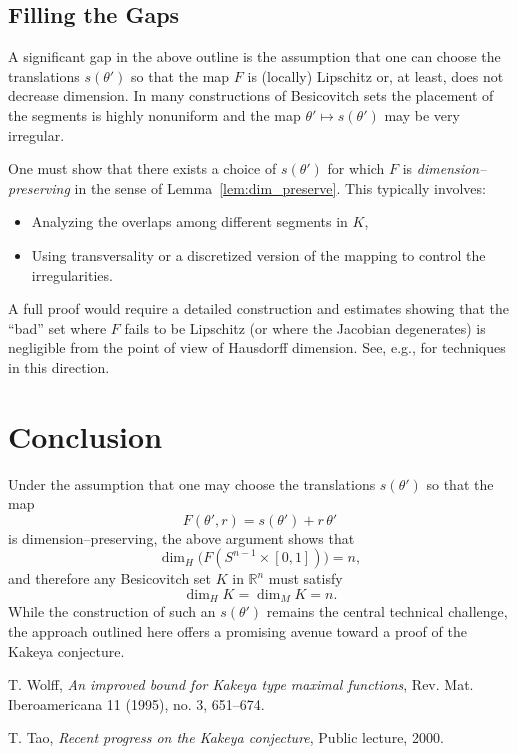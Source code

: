 \documentclass{amsart}
\begin{document}
\subsection{Filling the Gaps}
A significant gap in the above outline is the assumption that one can choose the translations $s(\theta')$ so that the map $F$ is (locally) Lipschitz or, at least, does not decrease dimension. In many constructions of Besicovitch sets the placement of the segments is highly nonuniform and the map $\theta'\mapsto s(\theta')$ may be very irregular.

One must show that there exists a choice of $s(\theta')$ for which $F$ is \emph{dimension–preserving} in the sense of Lemma~\ref{lem:dim_preserve}. This typically involves:
\begin{itemize}
    \item Analyzing the overlaps among different segments in $K$,
    \item Using transversality or a discretized version of the mapping to control the irregularities.
\end{itemize}
A full proof would require a detailed construction and estimates showing that the ``bad'' set where $F$ fails to be Lipschitz (or where the Jacobian degenerates) is negligible from the point of view of Hausdorff dimension. See, e.g., \cite{Wolff1995,Tao2000} for techniques in this direction.

\section{Conclusion}
Under the assumption that one may choose the translations $s(\theta')$ so that the map 
\[
F(\theta',r)= s(\theta')+r\,\theta'
\]
is dimension–preserving, the above argument shows that 
\[
\dim_H\bigl(F(S^{n-1}\times[0,1])\bigr)=n,
\]
and therefore any Besicovitch set $K$ in $\mathbb{R}^n$ must satisfy
\[
\dim_H K = \dim_M K = n.
\]
While the construction of such an $s(\theta')$ remains the central technical challenge, the approach outlined here offers a promising avenue toward a proof of the Kakeya conjecture.

\begin{thebibliography}{9}
T. Wolff, \emph{An improved bound for Kakeya type maximal functions}, Rev. Mat. Iberoamericana 11 (1995), no. 3, 651–674.

T. Tao, \emph{Recent progress on the Kakeya conjecture}, Public lecture, 2000.
\end{thebibliography}
\end{document}
